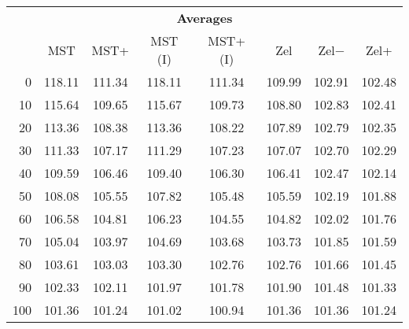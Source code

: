 \begin{tabular}{r|ccccccc}
      \multicolumn{8}{c}{{\bf Averages }} \\
      & MST & MST+ & MST (I) & MST+ (I) & Zel & Zel$-$ & Zel+ \\ \hline\hline
0
& 118.11
& 111.34
& 118.11
& 111.34
& 109.99
& 102.91
& 102.48
\\
10
& 115.64
& 109.65
& 115.67
& 109.73
& 108.80
& 102.83
& 102.41
\\
20
& 113.36
& 108.38
& 113.36
& 108.22
& 107.89
& 102.79
& 102.35
\\
30
& 111.33
& 107.17
& 111.29
& 107.23
& 107.07
& 102.70
& 102.29
\\
40
& 109.59
& 106.46
& 109.40
& 106.30
& 106.41
& 102.47
& 102.14
\\
50
& 108.08
& 105.55
& 107.82
& 105.48
& 105.59
& 102.19
& 101.88
\\
60
& 106.58
& 104.81
& 106.23
& 104.55
& 104.82
& 102.02
& 101.76
\\
70
& 105.04
& 103.97
& 104.69
& 103.68
& 103.73
& 101.85
& 101.59
\\
80
& 103.61
& 103.03
& 103.30
& 102.76
& 102.76
& 101.66
& 101.45
\\
90
& 102.33
& 102.11
& 101.97
& 101.78
& 101.90
& 101.48
& 101.33
\\
100
& 101.36
& 101.24
& 101.02
& 100.94
& 101.36
& 101.36
& 101.24
\\
\end{tabular}
